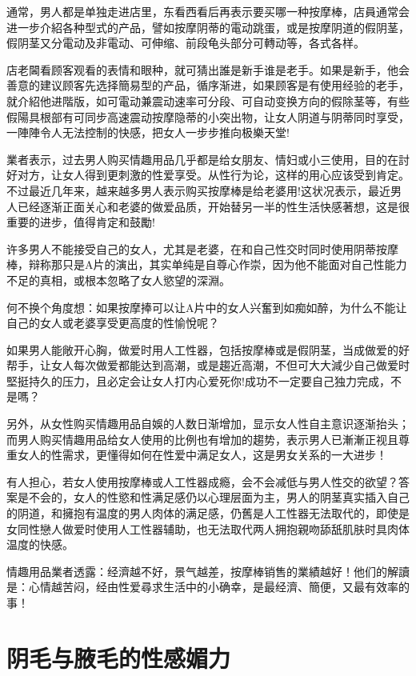 \documentclass[12pt,UTF8]{ctexbook}
\begin{document}
通常，男人都是单独走进店里，东看西看后再表示要买哪一种按摩棒，店員通常会进一步介紹各种型式的产品，譬如按摩阴蒂的電动跳蛋，或是按摩阴道的假阴茎，假阴茎又分電动及非電动、可伸缩、前段龟头部分可轉动等，各式各样。

店老閪看顾客观看的表情和眼种，就可猜出誰是新手谁是老手。如果是新手，他会善意的建议顾客先选择簡易型的产品，循序渐进，如果顾客是有使用经验的老手，就介紹他进階版，如可電动兼震动速率可分段、可自动变换方向的假除茎等，有些假陽具根部有可同步高速震动按摩隐蒂的小突出物，让女人阴道与阴蒂同时享受，一陣陣令人无法控制的快感，把女人一步步推向极樂天堂!

業者表示，过去男人购买情趣用品几乎都是给女朋友、情妇或小三使用，目的在討好对方，让女人得到更刺激的性爱享受。从性行为论，这样的用心应该受到肯定。不过最近几年来，越来越多男人表示购买按摩棒是给老婆用!这状况表示，最近男人已经逐渐正面关心和老婆的做爱品质，开始替另一半的性生活快感著想，这是很重要的进步，值得肯定和鼓勵!

许多男人不能接受自己的女人，尤其是老婆，在和自己性交时同时使用阴蒂按摩棒，辩称那只是A片的演出，其实单纯是自尊心作崇，因为他不能面对自己性能力不足的真相，或根本忽略了女人慾望的深淵。

何不换个角度想：如果按摩捧可以让A片中的女人兴奮到如痴如醉，为什么不能让自己的女人或老婆享受更高度的性愉悅呢？

如果男人能敞开心胸，做爱时用人工性器，包括按摩棒或是假阴茎，当成做爱的好帮手，让女人每次做爱都能达到高潮，或是趨近高潮，不但可大大減少自己做爱时堅挺持久的压力，且必定会让女人打内心爱死你!成功不一定要自己独力完成，不是嗎？

另外，从女性购买情趣用品自娛的人数日渐增加，显示女人性自主意识逐渐抬头；而男人购买情趣用品给女人使用的比例也有增加的趨势，表示男人已漸漸正视且尊重女人的性需求，更懂得如何在性爱中满足女人，这是男女关系的一大进步！

有人担心，若女人使用按摩棒或人工性器成瘾，会不会减低与男人性交的欲望？答案是不会的，女人的性慾和性满足感仍以心理层面为主，男人的阴茎真实插入自己的阴道，和擁抱有温度的男人肉体的满足感，仍舊是人工性器无法取代的，即使是女同性戀人做爱时使用人工性器辅助，也无法取代两人拥抱親吻舔舐肌肤时具肉体温度的快感。

情趣用品業者透露：经濟越不好，景气越差，按摩棒销售的業績越好！他们的解讀是：心情越苦闷，经由性爱尋求生活中的小确幸，是最经濟、簡便，又最有效率的事！

\chapter{阴毛与腋毛的性感媚力}
\end{document}
